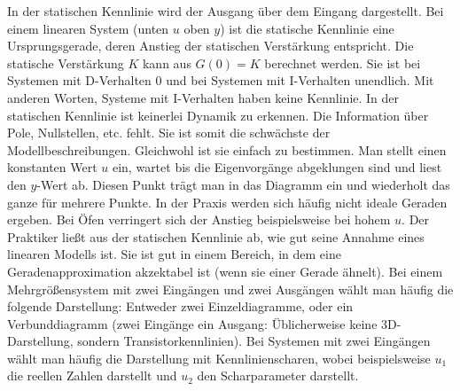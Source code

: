 In der statischen Kennlinie wird der Ausgang über dem Eingang dargestellt. 
Bei einem linearen System (unten $u$ oben $y$) ist die statische Kennlinie eine Ursprungsgerade, deren Anstieg der statischen Verstärkung entspricht. 
Die statische Verstärkung $K$ kann aus $G(0)=K$ berechnet werden. Sie ist bei Systemen mit D-Verhalten 0 und bei Systemen mit I-Verhalten unendlich. 
Mit anderen Worten, Systeme mit I-Verhalten haben keine Kennlinie. In der statischen Kennlinie ist keinerlei Dynamik zu erkennen. 
Die Information über Pole, Nullstellen, etc. fehlt. Sie ist somit die schwächste der Modellbeschreibungen. 
Gleichwohl ist sie einfach zu bestimmen. Man stellt einen konstanten Wert $u$ ein, wartet bis die Eigenvorgänge abgeklungen 
sind und liest den $y$-Wert ab. Diesen Punkt trägt man in das Diagramm ein und wiederholt das ganze für mehrere Punkte. In der Praxis werden sich häufig nicht ideale Geraden ergeben. Bei Öfen verringert sich der Anstieg beispielsweise bei hohem $u$. Der Praktiker ließt aus der statischen Kennlinie ab, wie gut seine Annahme eines linearen Modells ist. Sie ist gut in einem Bereich, in dem eine Geradenapproximation akzektabel ist (wenn sie einer Gerade ähnelt). Bei einem Mehrgrößensystem mit zwei Eingängen und zwei Ausgängen wählt man häufig die folgende Darstellung: Entweder zwei Einzeldiagramme, oder ein Verbunddiagramm (zwei Eingänge ein Ausgang: Üblicherweise keine 3D-Darstellung, sondern Transistorkennlinien). Bei Systemen mit zwei Eingängen 
wählt man häufig die Darstellung mit Kennlinienscharen, wobei beispielsweise $u_{1}$ die reellen Zahlen darstellt und $u_{2}$ den Scharparameter darstellt.
